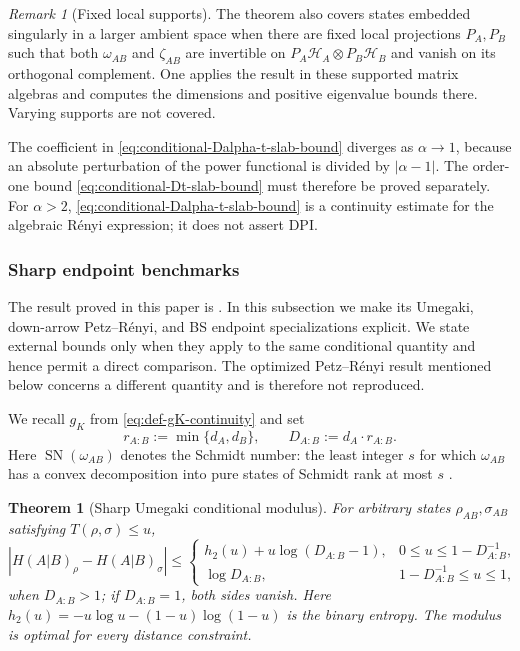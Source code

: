 \documentclass[11pt]{article}
\newtheorem{theorem}[theorem]{Theorem}
\theoremstyle{remark}
\newtheorem{remark}[remark]{Remark}
\newcommand{\1}{\mathbbm{1}}
\begin{document}
\begin{remark}[Fixed local supports]
The theorem also covers states embedded singularly in a larger
ambient space when there are fixed local projections $P_A,P_B$ such
that both $\omega_{AB}$ and $\zeta_{AB}$ are invertible on
$P_A\mathcal H_A\otimes P_B\mathcal H_B$ and vanish on its
orthogonal complement.  One applies the result in these supported
matrix algebras and computes the dimensions and positive eigenvalue
bounds there.  Varying supports are not covered.
\end{remark}

The coefficient in \eqref{eq:conditional-Dalpha-t-slab-bound}
diverges as $\alpha\to1$, because an absolute perturbation of the
power functional is divided by $|\alpha-1|$.  The order-one bound
\eqref{eq:conditional-Dt-slab-bound} must therefore be proved
separately.  For $\alpha>2$,
\eqref{eq:conditional-Dalpha-t-slab-bound} is a continuity estimate
for the algebraic R\'enyi expression; it does not assert DPI.

\subsubsection{Sharp endpoint benchmarks}
\label{subsec:conditional-sharp-endpoints}

The result proved in this paper is
.  In this subsection
we make its Umegaki, down-arrow Petz--R\'enyi, and BS endpoint
specializations explicit.  We state external bounds only when they
apply to the same conditional quantity and hence permit a direct
comparison.  The optimized Petz--R\'enyi result mentioned below
concerns a different quantity and is therefore not reproduced.

We recall $g_K$ from \eqref{eq:def-gK-continuity} and set
\begin{equation}
 r_{A:B}:=\min\{d_A,d_B\},
 \qquad D_{A:B}:=d_A\cdot r_{A:B}.
 \label{eq:effective-conditional-dimension}
\end{equation}
Here $\operatorname{SN}(\omega_{AB})$ denotes the Schmidt number: the
least integer $s$ for which $\omega_{AB}$ has a convex decomposition
into pure states of Schmidt rank at most $s$
\cite{terhal2000schmidt}.
\begin{theorem}[Sharp Umegaki conditional modulus]
\label{theo:sharp-order-one-conditional-modulus}
For arbitrary states $\rho_{AB},\sigma_{AB}$ satisfying
$T(\rho,\sigma)\leq u$,
\begin{equation}
 \left|H(A|B)_\rho-H(A|B)_\sigma\right|
 \leq
 \begin{cases}
  h_2(u)+u\log(D_{A:B}-1),
    &0\leq u\leq1-D_{A:B}^{-1},\\
  \log D_{A:B},
    &1-D_{A:B}^{-1}\leq u\leq1,
 \end{cases}
 \label{eq:sharp-order-one-effective-dimension}
\end{equation}
when $D_{A:B}>1$; if $D_{A:B}=1$, both sides vanish.  Here
$h_2(u)=-u\log u-(1-u)\log(1-u)$ is the binary entropy.  The modulus
is optimal for every distance constraint.
\end{theorem}
\end{document}
